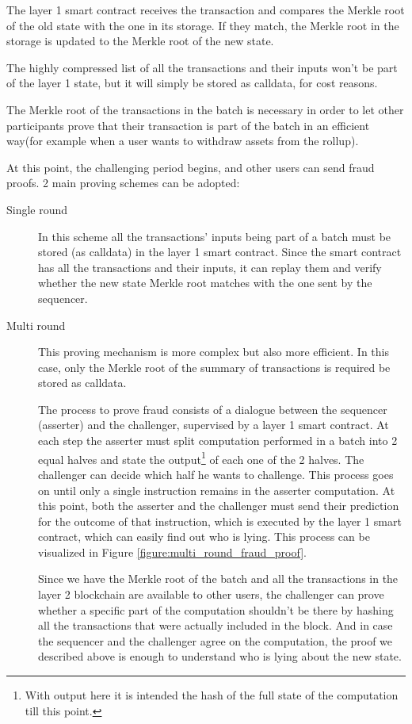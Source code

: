 \documentclass[12pt]{article}
\begin{document}
The layer 1 smart contract receives the transaction and compares the Merkle root of the old state with the one in its storage. If they match, the Merkle root in the storage is updated to the Merkle root of the new state.

The highly compressed list of all the transactions and their inputs won't be part of the layer 1 state, but it will simply be stored as calldata, for cost reasons.

The Merkle root of the transactions in the batch is necessary in order to let other participants prove that their transaction is part of the batch in an efficient way(for example when a user wants to withdraw assets from the rollup).

At this point, the challenging period begins, and other users can send fraud proofs. 2 main proving schemes can be adopted:
\begin{description}
    \item[Single round] In this scheme all the transactions' inputs being part of a batch must be stored (as calldata) in the layer 1 smart contract. Since the smart contract has all the transactions and their inputs, it can replay them and verify whether the new state Merkle root matches with the one sent by the sequencer.
    \item[Multi round] This proving mechanism is more complex but also more efficient. In this case, only the Merkle root of the summary of transactions is required be stored as calldata.
                        
                        The process to prove fraud consists of a dialogue between the sequencer (asserter) and the challenger, supervised by a layer 1 smart contract. At each step the asserter must split computation performed in a batch into 2 equal halves and state the output\footnote{With output here it is intended the hash of the full state of the computation till this point.} of each one of the 2 halves. The challenger can decide which half he wants to challenge.
                        This process goes on until only a single instruction remains in the asserter computation. At this point, both the asserter and the challenger must send their prediction for the outcome of that instruction, which is executed by the layer 1 smart contract, which can easily find out who is lying. This process can be visualized in Figure \ref{figure:multi_round_fraud_proof}.

                        Since we have the Merkle root of the batch and all the transactions in the layer 2 blockchain are available to other users, the challenger can prove whether a specific part of the computation shouldn't be there by hashing all the transactions that were actually included in the block. 
                        And in case the sequencer and the challenger agree on the computation, the proof we described above is enough to understand who is lying about the new state.
\end{description}
\end{document}
